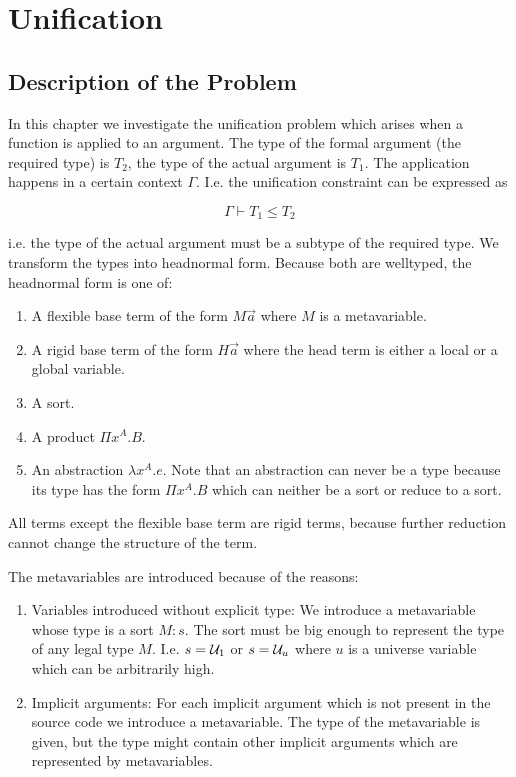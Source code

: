 \section{Unification}






\subsection{Description of the Problem}

In this chapter we investigate the unification problem which arises when a
function is applied to an argument. The type of the formal argument (the
required type) is $T_2$, the type of the actual argument is $T_1$. The application
happens in a certain context $\Gamma$. I.e. the unification constraint can be
expressed as

$$
    \Gamma \vdash T_1 \le T_2
$$

i.e. the type of the actual argument must be a subtype of the required type. We
transform the types into headnormal form. Because both are welltyped, the
headnormal form is one of:

\begin{enumerate}
    \item A flexible base term of the form $M \vec a$ where $M$ is a
        metavariable.

    \item A rigid base term of the form $H \vec a$ where the head term is either a
        local or a global variable.

    \item A sort.

    \item A product $\Pi x^A. B$.

    \item An abstraction $\lambda x^A. e$. Note that an abstraction can never be
        a type because its type has the form $\Pi x^A.B$ which can neither be a
        sort or reduce to a sort.
\end{enumerate}


All terms except the flexible base term are rigid terms, because further
reduction cannot change the structure of the term.


The metavariables are introduced because of the reasons:

\begin{enumerate}
    \item Variables introduced without explicit type: We introduce a
        metavariable whose type is a sort $M: s$. The sort must be big enough to
        represent the type of any legal type $M$. I.e. $s = {\mathcal U}_1$ or $s =
        {\mathcal U}_u$ where $u$ is a universe variable which can be arbitrarily high.

    \item Implicit arguments: For each implicit argument which is not present in
        the source code we introduce a metavariable. The type of the
        metavariable is given, but the type might contain other implicit
        arguments which are represented by metavariables.
\end{enumerate}


